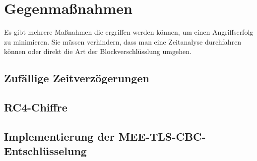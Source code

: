 \documentclass[a4paper,10pt]{scrartcl}
\begin{document}
    \section{Gegenmaßnahmen}\label{sec:gegenmanahmen}
    Es gibt mehrere Maßnahmen die ergriffen werden können, um einen Angriffserfolg zu minimieren.
    Sie müssen verhindern, dass man eine Zeitanalyse durchfahren können oder direkt die Art der Blockverschlüsslung umgehen.

    \subsection{Zufällige Zeitverzögerungen}

    \subsection{RC4-Chiffre}

    \subsection{Implementierung der MEE-TLS-CBC-Entschlüsselung}
    \newpage

    
\end{document}
